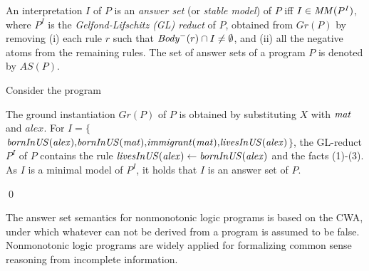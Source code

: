 An interpretation $I$ of $P$ is an \emph{answer set} (or \emph{stable model}) of $P$ iff $I \in \mathit{MM}(P^I)$, where $P^I$ is the \emph{Gelfond-Lifschitz (GL) reduct} \cite{GL1988} of $P$, obtained from $Gr(P)$ by removing (i) each rule $r$ such that $\mathit{Body}^-(r) \cap I\neq\emptyset$, and (ii) all the negative atoms from the remaining rules. The set of answer sets of a program $P$ is denoted by $AS(P)$.

\begin{example}
Consider the program \\
{\small {}}
            
\normalsize
{\smallskip

\noindent            
The ground instantiation $Gr(P)$ of $P$ is obtained by substituting $X$ with $\mathit{mat}$ and ${alex}$. For $I{=}\{${\small$\mathit{bornInUS(alex){,}bornInUS(mat){,}immigrant(mat){,}livesInUS(alex)}$}$\}$, the GL-reduct $P^I$ of $P$ contains the rule $\mathit{livesInUS(alex)\leftarrow bornInUS(alex)}$ and the facts (1)-(3). As $I$ is a minimal model of $P^I$, it holds that $I$ is an answer set of $P$.}\qed
\end{example}
\normalsize
The answer set semantics for nonmonotonic logic programs is based on the CWA, under which whatever can not be derived from a program is assumed to be false. Nonmonotonic logic programs are widely applied for formalizing common sense reasoning from incomplete information.



